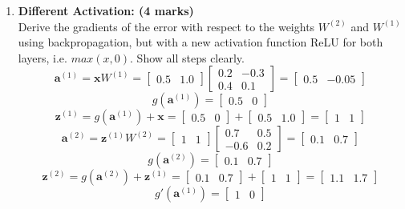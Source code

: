 \documentclass[12pt]{article}
\begin{document}
\begin{enumerate}[font=\Large]
	      \newpage
	\item \textbf{Different Activation: (4 marks)}\\
	      Derive the gradients of the error with respect to the weights $W^{(2)}$ and $W^{(1)}$ using backpropagation, but with a new activation function ReLU for both layers, i.e. $max(x, 0)$. Show all steps clearly.
	      $$
		      \mathbf{a}^{(1)} = \mathbf{x} W^{(1)} = \begin{bmatrix} 0.5 & 1.0 \end{bmatrix} \begin{bmatrix} 0.2 & -0.3 \\ 0.4 & 0.1 \end{bmatrix} = \begin{bmatrix} 0.5 & -0.05 \end{bmatrix}
	      $$
	      $$
		      g(\mathbf{a}^{(1)}) =  \begin{bmatrix} 0.5 & 0 \end{bmatrix}
	      $$
	      $$
		      \mathbf{z}^{(1)} = g(\mathbf{a}^{(1)}) + \mathbf{x} = \begin{bmatrix} 0.5 & 0 \end{bmatrix} + \begin{bmatrix} 0.5 & 1.0 \end{bmatrix} = \begin{bmatrix} 1 & 1 \end{bmatrix}
	      $$
	      $$
		      \mathbf{a}^{(2)} = \mathbf{z}^{(1)} W^{(2)} = \begin{bmatrix} 1 & 1 \end{bmatrix} \begin{bmatrix} 0.7 & 0.5 \\ -0.6 & 0.2 \end{bmatrix} = \begin{bmatrix} 0.1 & 0.7 \end{bmatrix}
	      $$
	      $$
		      g(\mathbf{a}^{(2)}) = \begin{bmatrix} 0.1 & 0.7 \end{bmatrix}
	      $$
	      $$
		      \mathbf{z}^{(2)} = g(\mathbf{a}^{(2)}) + \mathbf{z}^{(1)} =\begin{bmatrix} 0.1 & 0.7 \end{bmatrix} + \begin{bmatrix} 1 & 1 \end{bmatrix} = \begin{bmatrix} 1.1 & 1.7 \end{bmatrix}
	      $$
	      $$g'(\mathbf{a}^{(1)})=\begin{bmatrix} 1 & 0 \end{bmatrix}$$

\end{enumerate}
\end{document}

